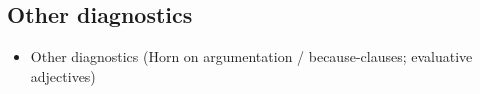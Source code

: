 \documentclass[12pt]{article}
\begin{document}

  \subsection{Other diagnostics} %
    
  

  \begin{itemize}
    \item Other diagnostics (Horn on argumentation / because-clauses; evaluative adjectives)
  \end{itemize}


\pagebreak



  
\end{document}
